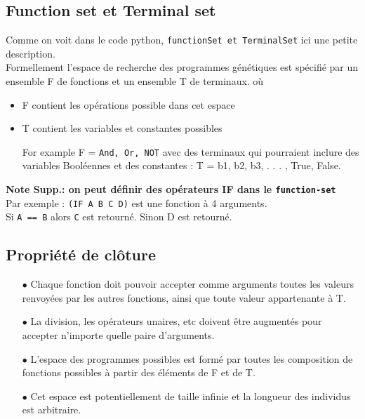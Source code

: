 \subsection{Function set et Terminal set}
Comme on voit dans le code python, \texttt{functionSet et TerminalSet} ici une petite 
description.\\
Formellement l'espace de recherche des programmes
génétiques est spécifié par un ensemble F de fonctions et un
ensemble T de terminaux. où
\begin{center}
\begin{itemize}
\item F contient les opérations possible dans cet espace
\item T contient les variables et constantes possibles
\item[] For example F = \texttt{And, Or, NOT}
avec des terminaux qui pourraient inclure des variables Booléennes
et des constantes :
T = {b1, b2, b3, . . . , True, False}.
\end{itemize}
\end{center}
\textbf{Note Supp.: on peut définir des opérateurs IF dans le \texttt{function-set}}\\
Par exemple : \texttt{(IF A B C D)} est une fonction à 4 arguments.\\
Si \texttt{A == B} alors \texttt{C} est retourné. Sinon D est retourné.

\subsection{Propriété de clôture}
\begin{itemize}
\item[$ \bullet $] Chaque fonction doit pouvoir accepter comme arguments
toutes les valeurs renvoyées par les autres fonctions, ainsi que
toute valeur appartenante à T.
\item[$ \bullet $] La division, les opérateurs unaires, etc doivent être augmentés
pour accepter n'importe quelle paire d'arguments.
\item[$ \bullet $] L'espace des programmes possibles est formé par toutes les
composition de fonctions possibles à partir des éléments de F
et de T.
\item[$ \bullet $] Cet espace est potentiellement de taille infinie et la longueur des 
individus est arbitraire.
\end{itemize}
